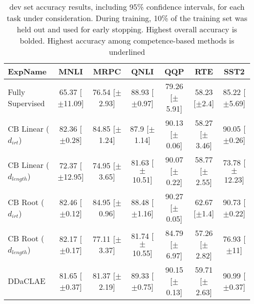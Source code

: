 \begin{table*}[ht]
\centering
\begingroup\small
\begin{tabular}{lcccccc}
  \toprule
ExpName & MNLI & MRPC & QNLI & QQP & RTE & SST2 \\ 
  \midrule
Fully Supervised & 65.37 [$\pm$11.09] & 76.54 [$\pm$2.93] & 88.93 [$\pm$0.97] & 79.26 [$\pm$5.91] & 58.23 [$\pm$2.4] & 85.22 [$\pm$5.69] \\ 
  CB Linear ($d_{irt}$) & 82.36 [$\pm$0.28] & 84.85 [$\pm$1.24] & 87.9 [$\pm$1.14] & 90.13 [$\pm$0.06] & 58.27 [$\pm$3.46] & 90.05 [$\pm$0.26] \\ 
  CB Linear ($d_{length}$) & 72.37 [$\pm$12.95] & 74.95 [$\pm$3.65] & 81.63 [$\pm$10.51] & 90.07 [$\pm$0.22] & 58.77 [$\pm$2.55] & 73.78 [$\pm$12.23] \\ 
  CB Root ($d_{irt}$) & 82.46 [$\pm$0.12] & 84.95 [$\pm$0.96] & 88.48 [$\pm$1.16] & 90.27 [$\pm$0.05] & 62.67 [$\pm$1.4] & 90.73 [$\pm$0.22] \\ 
  CB Root ($d_{length}$) & 82.17 [$\pm$0.17] & 77.11 [$\pm$3.37] & 81.74 [$\pm$10.55] & 84.79 [$\pm$6.97] & 57.26 [$\pm$2.82] & 76.93 [$\pm$11] \\ 
  DDaCLAE & 81.65 [$\pm$0.37] & 81.37 [$\pm$2.19] & 89.33 [$\pm$0.75] & 90.15 [$\pm$0.13] & 59.71 [$\pm$2.63] & 90.99 [$\pm$0.37] \\ 
   \bottomrule
\end{tabular}
\endgroup
\caption{dev set accuracy results, including 95\% confidence intervals, for each task under consideration. During training, 10\% of the training set was held out and used for early stopping. Highest overall accuracy is bolded. Highest accuracy among competence-based methods is underlined} 
\label{tab:acc_bert-True}
\end{table*}

